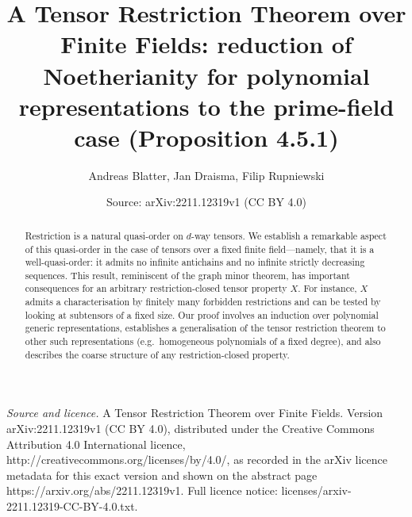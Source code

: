\documentclass[10pt,a4paper]{amsart}
\title[Reduction of Noetherianity to the prime-field case]{A Tensor Restriction Theorem over Finite Fields: reduction of Noetherianity for polynomial representations to the prime-field case (Proposition 4.5.1)}
\author{Andreas Blatter, Jan Draisma, Filip Rupniewski}
\date{Source: arXiv:2211.12319v1 (CC BY 4.0)}
\theoremstyle{plain}
\theoremstyle{definition}
\begin{document}
\maketitle
\begin{abstract}
Restriction is a natural quasi-order on $d$-way tensors. We establish
a remarkable aspect of this quasi-order in the case of tensors over a
fixed finite field---namely, that it is a well-quasi-order: it admits no
infinite antichains and no infinite strictly decreasing sequences. This
result, reminiscent of the graph minor theorem, has important consequences
for an arbitrary restriction-closed tensor property $X$. For instance,
$X$ admits a characterisation by finitely many forbidden restrictions
and can be tested by looking at subtensors of a fixed size.  Our
proof involves an induction over polynomial generic representations,
establishes a generalisation of the tensor restriction theorem to other
such representations (e.g.~homogeneous polynomials of a fixed degree),
and also describes the coarse structure of any 
restriction-closed property. 
\end{abstract}


\noindent\emph{Source and licence.} A Tensor Restriction Theorem over Finite Fields. Version arXiv:2211.12319v1 (CC BY 4.0), distributed under the Creative Commons Attribution 4.0 International licence, http://creativecommons.org/licenses/by/4.0/, as recorded in the arXiv licence metadata for this exact version and shown on the abstract page https://arxiv.org/abs/2211.12319v1. Full licence notice: licenses/arxiv-2211.12319-CC-BY-4.0.txt.\par\smallskip
\end{document}
